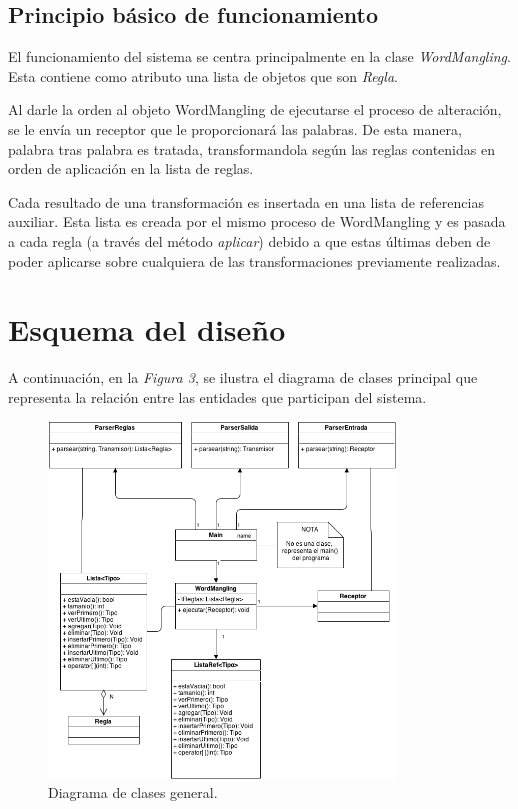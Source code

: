 \documentclass{article}
\begin{document}
\subsection{Principio básico de funcionamiento}

	El funcionamiento del sistema se centra principalmente en la clase \textit{WordMangling}. Esta contiene como atributo una lista de objetos que son \textit{Regla}.
	\par
	Al darle la orden al objeto WordMangling de ejecutarse el proceso de alteración, se le envía un receptor que le proporcionará las palabras. De esta manera, palabra tras palabra es tratada, transformandola según las reglas contenidas en orden de aplicación en la lista de reglas.
	\par
	Cada resultado de una transformación es insertada en una lista de referencias auxiliar. Esta lista es creada por el mismo proceso de WordMangling y es pasada a cada regla (a través del método \textit{aplicar}) debido a que estas últimas deben de poder aplicarse sobre cualquiera de las transformaciones previamente realizadas.
\bigskip\medskip


\section{Esquema del diseño}

	A continuación, en la \textit{Figura 3}, se ilustra el diagrama de clases principal que representa la relación entre las entidades que participan del sistema.
\bigskip\bigskip


\begin{figure}[h]
	\centering
	\includegraphics[width=0.82\textwidth]{images/diagrama_1.png}
	\medskip
	\caption{Diagrama de clases general.}
\end{figure}
\end{document}
